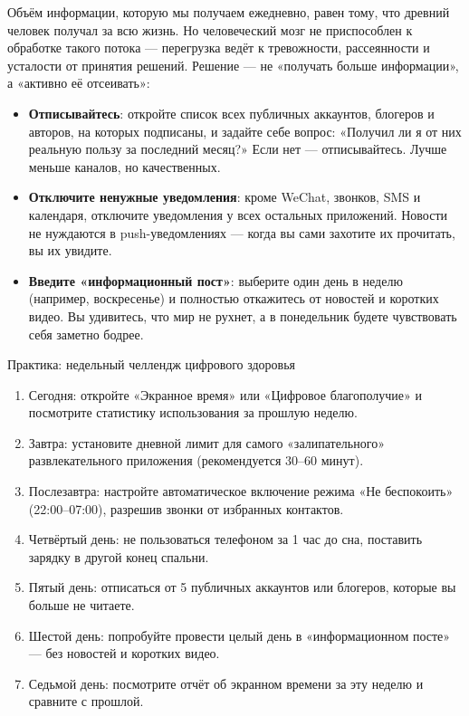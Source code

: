 
Объём информации, которую мы получаем ежедневно, равен тому, что древний человек получал за всю жизнь. Но человеческий мозг не приспособлен к обработке такого потока — перегрузка ведёт к тревожности, рассеянности и усталости от принятия решений. Решение — не «получать больше информации», а «активно её отсеивать»:

\begin{itemize}
  \item \textbf{Отписывайтесь}: откройте список всех публичных аккаунтов, блогеров и авторов, на которых подписаны, и задайте себе вопрос: «Получил ли я от них реальную пользу за последний месяц?» Если нет — отписывайтесь. Лучше меньше каналов, но качественных.
  \item \textbf{Отключите ненужные уведомления}: кроме WeChat, звонков, SMS и календаря, отключите уведомления у всех остальных приложений. Новости не нуждаются в push-уведомлениях — когда вы сами захотите их прочитать, вы их увидите.
  \item \textbf{Введите «информационный пост»}: выберите один день в неделю (например, воскресенье) и полностью откажитесь от новостей и коротких видео. Вы удивитесь, что мир не рухнет, а в понедельник будете чувствовать себя заметно бодрее.
\end{itemize}

\begin{tcbpractice}{Практика: недельный челлендж цифрового здоровья}
\begin{enumerate}
  \item Сегодня: откройте «Экранное время» или «Цифровое благополучие» и посмотрите статистику использования за прошлую неделю.
  \item Завтра: установите дневной лимит для самого «залипательного» развлекательного приложения (рекомендуется 30–60 минут).
  \item Послезавтра: настройте автоматическое включение режима «Не беспокоить» (22:00–07:00), разрешив звонки от избранных контактов.
  \item Четвёртый день: не пользоваться телефоном за 1 час до сна, поставить зарядку в другой конец спальни.
  \item Пятый день: отписаться от 5 публичных аккаунтов или блогеров, которые вы больше не читаете.
  \item Шестой день: попробуйте провести целый день в «информационном посте» — без новостей и коротких видео.
  \item Седьмой день: посмотрите отчёт об экранном времени за эту неделю и сравните с прошлой.
\end{enumerate}

\end{tcbpractice}

